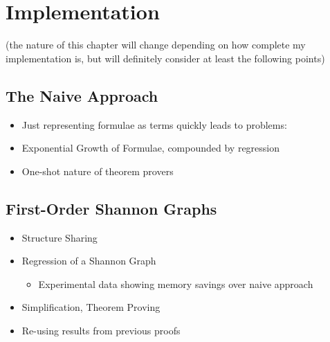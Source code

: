 \chapter{Implementation}\label{ch:implementation}

(the nature of this chapter will change depending on how complete my implementation is, but will definitely consider at least the following points)

\section{The Naive Approach}

\begin{itemize}
\item Just representing formulae as terms quickly leads to problems:
\item Exponential Growth of Formulae, compounded by regression
\item One-shot nature of theorem provers
\end{itemize}

\section{First-Order Shannon Graphs}

\begin{itemize}
\item Structure Sharing
\item Regression of a Shannon Graph
  \begin{itemize}
  \item Experimental data showing memory savings over naive approach
  \end{itemize}
\item Simplification, Theorem Proving
\item Re-using results from previous proofs
\end{itemize}

